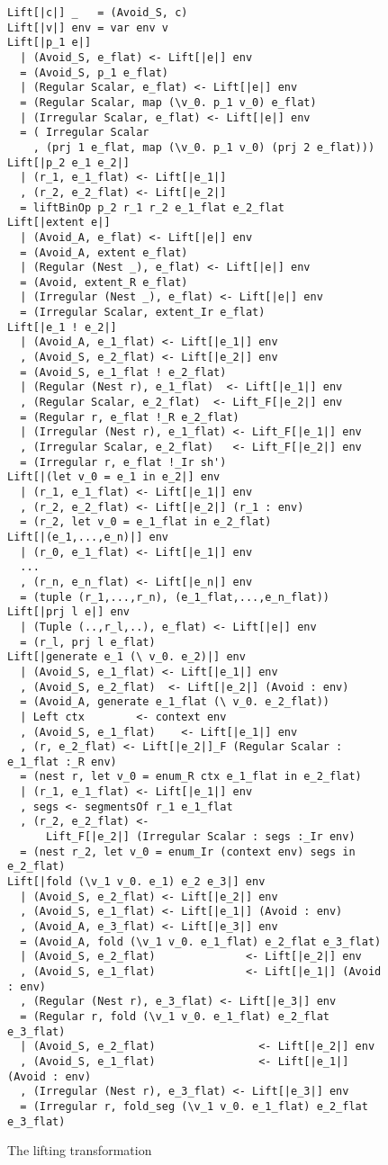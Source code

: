 \begin{figure}
\begin{lstlisting}[basicstyle=\footnotesize\ttfamily,multicols=2,style=ndp]
Lift[|c|] _   = (Avoid_S, c)
Lift[|v|] env = var env v
Lift[|p_1 e|]
  | (Avoid_S, e_flat) <- Lift[|e|] env
  = (Avoid_S, p_1 e_flat)
  | (Regular Scalar, e_flat) <- Lift[|e|] env
  = (Regular Scalar, map (\v_0. p_1 v_0) e_flat)
  | (Irregular Scalar, e_flat) <- Lift[|e|] env
  = ( Irregular Scalar
    , (prj 1 e_flat, map (\v_0. p_1 v_0) (prj 2 e_flat)))
Lift[|p_2 e_1 e_2|]
  | (r_1, e_1_flat) <- Lift[|e_1|]
  , (r_2, e_2_flat) <- Lift[|e_2|]
  = liftBinOp p_2 r_1 r_2 e_1_flat e_2_flat
Lift[|extent e|]
  | (Avoid_A, e_flat) <- Lift[|e|] env
  = (Avoid_A, extent e_flat)
  | (Regular (Nest _), e_flat) <- Lift[|e|] env
  = (Avoid, extent_R e_flat)
  | (Irregular (Nest _), e_flat) <- Lift[|e|] env
  = (Irregular Scalar, extent_Ir e_flat)
Lift[|e_1 ! e_2|]
  | (Avoid_A, e_1_flat) <- Lift[|e_1|] env
  , (Avoid_S, e_2_flat) <- Lift[|e_2|] env
  = (Avoid_S, e_1_flat ! e_2_flat)
  | (Regular (Nest r), e_1_flat)  <- Lift[|e_1|] env
  , (Regular Scalar, e_2_flat)  <- Lift_F[|e_2|] env
  = (Regular r, e_flat !_R e_2_flat)
  | (Irregular (Nest r), e_1_flat) <- Lift_F[|e_1|] env
  , (Irregular Scalar, e_2_flat)   <- Lift_F[|e_2|] env
  = (Irregular r, e_flat !_Ir sh')
Lift[|(let v_0 = e_1 in e_2|] env
  | (r_1, e_1_flat) <- Lift[|e_1|] env
  , (r_2, e_2_flat) <- Lift[|e_2|] (r_1 : env)
  = (r_2, let v_0 = e_1_flat in e_2_flat)
Lift[|(e_1,...,e_n)|] env
  | (r_0, e_1_flat) <- Lift[|e_1|] env
  ...
  , (r_n, e_n_flat) <- Lift[|e_n|] env
  = (tuple (r_1,...,r_n), (e_1_flat,...,e_n_flat))
Lift[|prj l e|] env
  | (Tuple (..,r_l,..), e_flat) <- Lift[|e|] env
  = (r_l, prj l e_flat)
Lift[|generate e_1 (\ v_0. e_2)|] env
  | (Avoid_S, e_1_flat) <- Lift[|e_1|] env
  , (Avoid_S, e_2_flat)  <- Lift[|e_2|] (Avoid : env)
  = (Avoid_A, generate e_1_flat (\ v_0. e_2_flat))
  | Left ctx        <- context env
  , (Avoid_S, e_1_flat)    <- Lift[|e_1|] env
  , (r, e_2_flat) <- Lift[|e_2|]_F (Regular Scalar : e_1_flat :_R env)
  = (nest r, let v_0 = enum_R ctx e_1_flat in e_2_flat)
  | (r_1, e_1_flat) <- Lift[|e_1|] env
  , segs <- segmentsOf r_1 e_1_flat
  , (r_2, e_2_flat) <-
      Lift_F[|e_2|] (Irregular Scalar : segs :_Ir env)
  = (nest r_2, let v_0 = enum_Ir (context env) segs in e_2_flat)
Lift[|fold (\v_1 v_0. e_1) e_2 e_3|] env
  | (Avoid_S, e_2_flat) <- Lift[|e_2|] env
  , (Avoid_S, e_1_flat) <- Lift[|e_1|] (Avoid : env)
  , (Avoid_A, e_3_flat) <- Lift[|e_3|] env
  = (Avoid_A, fold (\v_1 v_0. e_1_flat) e_2_flat e_3_flat)
  | (Avoid_S, e_2_flat)              <- Lift[|e_2|] env
  , (Avoid_S, e_1_flat)              <- Lift[|e_1|] (Avoid : env)
  , (Regular (Nest r), e_3_flat) <- Lift[|e_3|] env
  = (Regular r, fold (\v_1 v_0. e_1_flat) e_2_flat e_3_flat)
  | (Avoid_S, e_2_flat)                <- Lift[|e_2|] env
  , (Avoid_S, e_1_flat)                <- Lift[|e_1|] (Avoid : env)
  , (Irregular (Nest r), e_3_flat) <- Lift[|e_3|] env
  = (Irregular r, fold_seg (\v_1 v_0. e_1_flat) e_2_flat e_3_flat)
\end{lstlisting}
\caption{The lifting transformation}
\label{fig:lifting-transform}
\end{figure}

